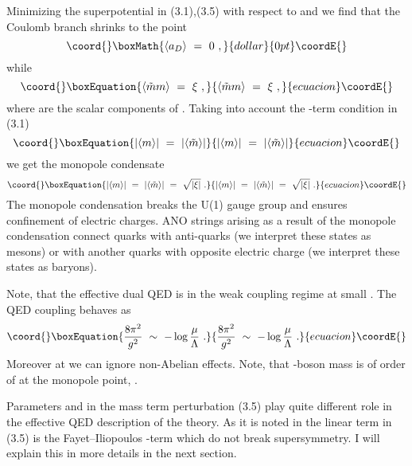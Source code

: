 \documentclass[a4paper,12pt]{article}
\begin{document}
Minimizing the superpotential in (3.1),(3.5) with respect to
\coordHE{} and \coordHE{} we find that the Coulomb branch shrinks
to the point
$$\coord{}\boxMath{
\langle a_D\rangle\ =\ 0\ ,
}{dollar}{0pt}\coordE{}$$
while
\begin{equation}\coord{}\boxEquation{
\langle \tilde mm\rangle\ =\ \xi\ ,
}{
\langle \tilde mm\rangle\ =\ \xi\ ,
}{ecuacion}\coordE{}\end{equation}
where \coordHE{} are the scalar components of \coordHE{}.
Taking into account  the \coordHE{}-term condition in (3.1)
\begin{equation}\coord{}\boxEquation{
|\langle m\rangle|\ =\ |\langle\tilde m\rangle|
}{
|\langle m\rangle|\ =\ |\langle\tilde m\rangle|
}{ecuacion}\coordE{}\end{equation}
we get the monopole condensate
\begin{equation}\coord{}\boxEquation{
|\langle m\rangle|\ =\ |\langle\tilde m\rangle|\ =\ \sqrt{|\xi|}\ .
}{
|\langle m\rangle|\ =\ |\langle\tilde m\rangle|\ =\ \sqrt{|\xi|}\ .
}{ecuacion}\coordE{}\end{equation}
The monopole condensation breaks
 the U(1) gauge group and  ensures 
confinement of electric charges. ANO strings arising as a result
of  the monopole condensation connect quarks with anti-quarks (we
interpret these states as mesons) or with another quarks with
opposite electric charge (we interpret these states as
baryons).

Note, that the effective  dual QED is in the weak coupling regime at small
\myHighlight{$\mu $}\coordHE{}. The QED coupling behaves as
\begin{equation}\coord{}\boxEquation{
\frac{8\pi^2}{g^2}\ \sim\ -\log\frac{\mu }\Lambda\ .
}{
\frac{8\pi^2}{g^2}\ \sim\ -\log\frac{\mu }\Lambda\ .
}{ecuacion}\coordE{}\end{equation}
Moreover at \myHighlight{$\mu\ll\Lambda$}\coordHE{} we can ignore non-Abelian effects. Note,
that \coordHE{}-boson mass \coordHE{} is of order of \myHighlight{$\Lambda$}\coordHE{} at
the monopole point, \coordHE{}.


Parameters \myHighlight{$\xi$}\coordHE{} and \coordHE{} in the mass term perturbation
(3.5) play quite
different role in the effective QED description of the theory.
As it is noted in \cite{HSZ} the linear term in (3.5)
is the Fayet--Iliopoulos \coordHE{}-term which do not break \coordHE{}
supersymmetry.  I will explain this in more details in the next
section.
\end{document}
